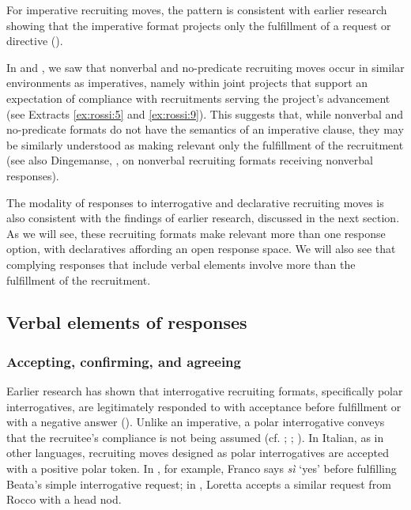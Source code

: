 \documentclass[output=paper,modfonts]{langscibook}
\begin{document}
For imperative recruiting moves, the pattern is consistent with earlier research showing that the imperative format projects only the fulfillment of a request or directive (\citealt[chap. 3]{Wootton1997,Goodwin2006,CravenPotter2010,Kent2011,kent_compliance_2012,Rossi2012,Rossi2015a}). 

In  and , we saw that nonverbal and no-predicate recruiting moves occur in similar environments as imperatives, namely within joint projects that support an expectation of compliance with recruitments serving the project's advancement (see Extracts \ref{ex:rossi:5} and \ref{ex:rossi:9}). This suggests that, while nonverbal and no-predicate formats do not have the semantics of an imperative clause, they may be similarly understood as making relevant only the fulfillment of the recruitment (see also Dingemanse, ,  on nonverbal recruiting formats receiving nonverbal responses).

The modality of responses to interrogative and declarative recruiting moves is also consistent with the findings of earlier research, discussed in the next section. As we will see, these recruiting formats make relevant more than one response option, with declaratives affording an open response space. We will also see that complying responses that include verbal elements involve more than the fulfillment of the recruitment.

\subsection{Verbal elements of responses}\label{sec:rossi:4.2}

\subsubsection{Accepting, confirming, and agreeing}\label{sec:rossi:4.2.1}

Earlier research has shown that interrogative recruiting formats, specifically polar interrogatives, are legitimately responded to with acceptance before fulfillment or with a negative answer (\citealt[chapp. 3--4]{Wootton1997,Raymond2003,CravenPotter2010,Kent2011,Rossi2012,Rossi2015a}). Unlike an imperative, a polar interrogative conveys that the recruitee's compliance is not being assumed (cf. \citealt[74]{Searle1975}; \citealt[60]{ErvinTripp1976}; \citealt[159]{Wierzbicka1991}). In Italian, as in other languages, recruiting moves designed as polar interrogatives are accepted with a positive polar token. In , for example, Franco says \textit{sì} ‘yes’ before fulfilling Beata's simple interrogative request; in , Loretta accepts a similar request from Rocco with a head nod. %
\end{document}
